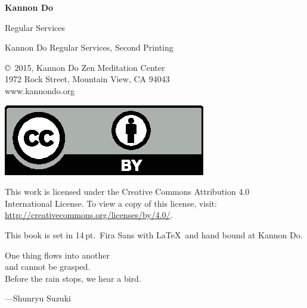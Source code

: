 \documentclass{kdo}
\begin{document}

\frontmatter
\begin{titlepage}
{\Huge\bf Kannon Do

  \bigskip\bigskip

 Regular Services}
\end{titlepage}

\begin{colophon}
Kannon Do Regular Services, Second Printing

\bigskip

\copyright\ 2015, Kannon Do Zen Meditation Center\\
1972 Rock Street, Mountain View, CA 94043\\
www.kannondo.org

\includegraphics{by}

This work is licensed under the Creative Commons Attribution 4.0\\
International License. To view a copy of this license, visit:\\
\url{http://creativecommons.org/licenses/by/4.0/}.

\bigskip

This book is set in 14\,pt.\ Fira Sans with \LaTeX\ and hand bound at Kannon Do.
\end{colophon}

\begin{dedication}
One thing flows into another\\
and cannot be grasped.\\
Before the rain stops, we hear a bird.

---Shunryu Suzuki
\end{dedication}

\cleardoublepage

\tableofcontents

\mainmatter
\end{document}
